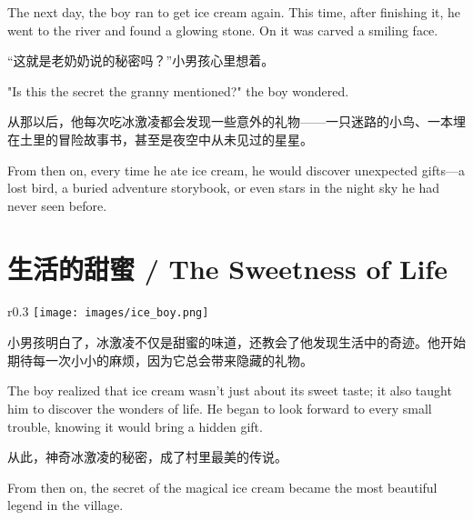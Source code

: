 \begin{flushright}
The next day, the boy ran to get ice cream again. This time, after finishing it, he went to the river and found a glowing stone. On it was carved a smiling face.
\end{flushright}

“这就是老奶奶说的秘密吗？”小男孩心里想着。

\begin{flushright}
"Is this the secret the granny mentioned?" the boy wondered.
\end{flushright}

从那以后，他每次吃冰激凌都会发现一些意外的礼物——一只迷路的小鸟、一本埋在土里的冒险故事书，甚至是夜空中从未见过的星星。

\begin{flushright}
From then on, every time he ate ice cream, he would discover unexpected gifts—a lost bird, a buried adventure storybook, or even stars in the night sky he had never seen before.
\end{flushright}

\section*{生活的甜蜜 / The Sweetness of Life}

\begin{wrapfigure}{r}{0.3\textwidth}  %
    \texttt{[image: images/ice\_boy.png]} %
\end{wrapfigure}

小男孩明白了，冰激凌不仅是甜蜜的味道，还教会了他发现生活中的奇迹。他开始期待每一次小小的麻烦，因为它总会带来隐藏的礼物。

\begin{flushright}
The boy realized that ice cream wasn’t just about its sweet taste; it also taught him to discover the wonders of life. He began to look forward to every small trouble, knowing it would bring a hidden gift.
\end{flushright}

从此，神奇冰激凌的秘密，成了村里最美的传说。

\begin{flushright}
From then on, the secret of the magical ice cream became the most beautiful legend in the village.
\end{flushright}
